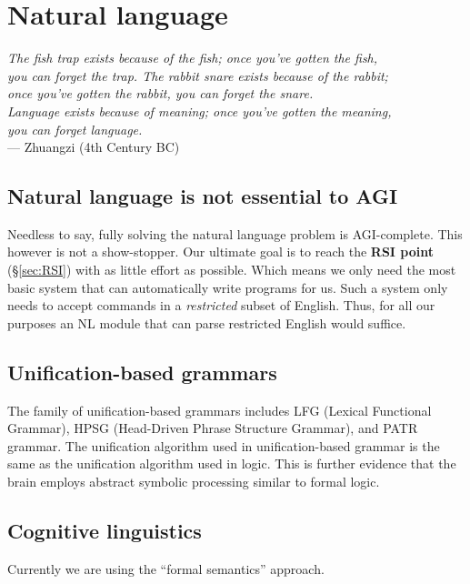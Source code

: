 \chapter{Natural language}
\begin{flushright}
\emph{The fish trap exists because of the fish; once you've gotten the fish,\\
you can forget the trap. The rabbit snare exists because of the rabbit;\\
once you've gotten the rabbit, you can forget the snare.\\
Language exists because of meaning; once you've gotten the meaning,\\
you can forget language.}\\ --- Zhuangzi (4th Century BC)
\end{flushright}
\minitoc

\section{Natural language is not essential to AGI}

Needless to say, fully solving the natural language problem is AGI-complete.  This however is not a show-stopper.  Our ultimate goal is to reach the \textbf{RSI point} (\S\ref{sec:RSI}) with as little effort as possible.  Which means we only need the most basic system that can automatically write programs for us.  Such a system only needs to accept commands in a \textit{restricted} subset of English.  Thus, for all our purposes an NL module that can parse restricted English would suffice.

\section{Unification-based grammars}

The family of unification-based grammars includes LFG (Lexical Functional Grammar), HPSG (Head-Driven Phrase Structure Grammar), and PATR grammar.  The unification algorithm used in unification-based grammar is the same as the unification algorithm used in logic.  This is further evidence that the brain employs abstract symbolic processing similar to formal logic.

\section{Cognitive linguistics}

Currently we are using the ``formal semantics'' approach.

